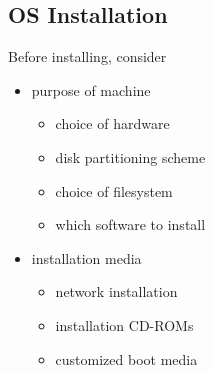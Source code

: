 \documentclass[xga]{xdvislides}
\begin{document}
\subsection{OS Installation}
Before installing, consider
\begin{itemize}
	\item purpose of machine
		\begin{itemize}
			\item choice of hardware
			\item disk partitioning scheme
			\item choice of filesystem
			\item which software to install
		\end{itemize}
	\item installation media
		\begin{itemize}
			\item network installation
			\item installation CD-ROMs
			\item customized boot media
		\end{itemize}
\end{itemize}

%
%
%
%
\end{document}
